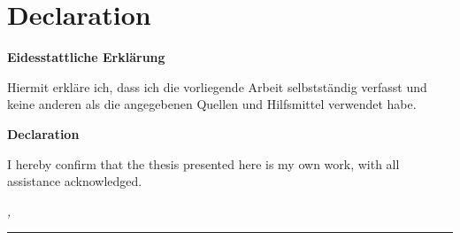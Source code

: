%
\chapter*{Declaration}
\label{sec:declaration}
\thispagestyle{empty}





\textbf{Eidesstattliche Erklärung}

Hiermit erkläre ich, dass ich die vorliegende Arbeit selbstständig verfasst und keine anderen als die angegebenen Quellen und Hilfsmittel verwendet habe.

\smallskip

\textbf{Declaration}

I hereby confirm that the thesis presented here is my own work, with all assistance acknowledged.

\bigskip

\begin{flushright}
\noindent\textit{\thesisUniversityCity, \thesisDate}

\bigskip

\rule{5cm}{1pt}

\authorName
\end{flushright}





